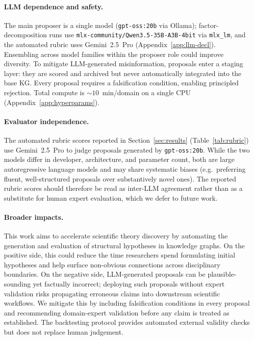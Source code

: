 \paragraph{LLM dependence and safety.}
The main proposer is a single model (\texttt{gpt-oss:20b} via Ollama);
factor-decomposition runs use \texttt{mlx-community/Qwen3.5-35B-A3B-4bit}
via \texttt{mlx\_lm}, and the automated rubric uses Gemini~2.5~Pro
(Appendix~\ref{app:llm-decl}).  Ensembling across model families within the
proposer role could improve diversity.  To mitigate LLM-generated
misinformation, proposals enter a staging layer: they are scored and archived
but never automatically integrated into the base KG.  Every proposal requires
a falsification condition, enabling principled rejection.
Total compute is ${\sim}10$~min/domain on a single CPU
(Appendix~\ref{app:hyperparams}).

\paragraph{Evaluator independence.}
The automated rubric scores reported in Section~\ref{sec:results}
(Table~\ref{tab:rubric}) use Gemini~2.5~Pro to judge proposals
generated by \texttt{gpt-oss:20b}.  While the two models differ in
developer, architecture, and parameter count, both are large
autoregressive language models and may share systematic biases
(e.g.\ preferring fluent, well-structured proposals over substantively
novel ones).  The reported rubric scores should therefore be read as
inter-LLM agreement rather than as a substitute for human expert
evaluation, which we defer to future work.

\paragraph{Broader impacts.}
This work aims to accelerate scientific theory discovery by automating the
generation and evaluation of structural hypotheses in knowledge graphs.  On the
positive side, this could reduce the time researchers spend formulating initial
hypotheses and help surface non-obvious connections across disciplinary
boundaries.  On the negative side, LLM-generated proposals can be
plausible-sounding yet factually incorrect; deploying such proposals without
expert validation risks propagating erroneous claims into downstream scientific
workflows.  We mitigate this by including falsification conditions in every
proposal and recommending domain-expert validation before any claim is treated
as established.  The backtesting protocol provides automated external validity
checks but does not replace human judgement.

